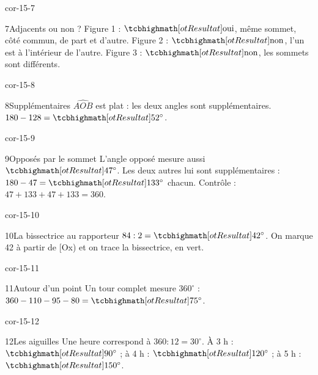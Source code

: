 \begin{blocLivre}{cor-15-7}\begin{corrige}{7}{Adjacents ou non ?}
Figure 1 : $\res{\text{oui}}$, même sommet, côté commun, de part et d’autre. Figure 2 : $\res{\text{non}}$, l’un est à l’intérieur de l’autre. Figure 3 : $\res{\text{non}}$, les sommets sont différents.
\label{fig-cor-15-7}
\end{corrige}\end{blocLivre}
\begin{blocLivre}{cor-15-8}\begin{corrige}{8}{Supplémentaires}
$\widehat{AOB}$ est plat : les deux angles sont supplémentaires. $180-128=\res{52^\circ}$.
\label{fig-cor-15-8}
\end{corrige}\end{blocLivre}
\begin{blocLivre}{cor-15-9}\begin{corrige}{9}{Opposés par le sommet}
L’angle opposé mesure aussi $\res{47^\circ}$. Les deux autres lui sont supplémentaires : $180-47=\res{133^\circ}$ chacun. Contrôle : $47+133+47+133=360$.
\label{fig-cor-15-9}
\end{corrige}\end{blocLivre}
\begin{blocLivre}{cor-15-10}\begin{corrige}{10}{La bissectrice au rapporteur}
$84:2=\res{42^\circ}$. On marque 42 à partir de [Ox) et on trace la bissectrice, en vert.
\label{fig-cor-15-10}
\end{corrige}\end{blocLivre}
\begin{blocLivre}{cor-15-11}\begin{corrige}{11}{Autour d’un point}
Un tour complet mesure $360^\circ$ : $360-110-95-80=\res{75^\circ}$.
\label{fig-cor-15-11}
\end{corrige}\end{blocLivre}
\begin{blocLivre}{cor-15-12}\begin{corrige}{12}{Les aiguilles}
Une heure correspond à $360:12=30^\circ$. À 3 h : $\res{90^\circ}$ ; à 4 h : $\res{120^\circ}$ ; à 5 h : $\res{150^\circ}$.
\label{fig-cor-15-12}
\end{corrige}\end{blocLivre}
